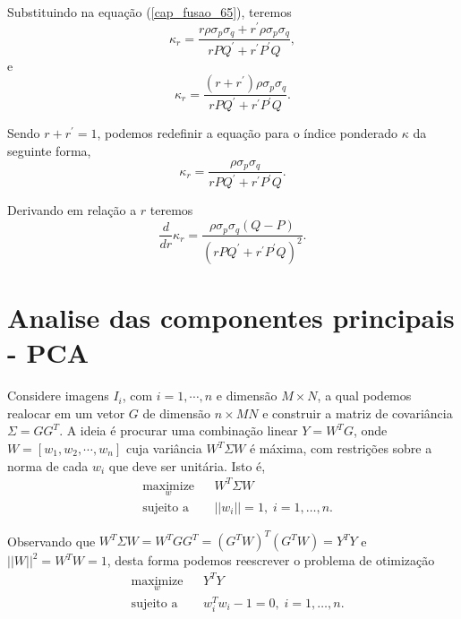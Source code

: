 Substituindo na equação (\ref{cap_fusao_65}), teremos
\begin{equation}\nonumber
	\kappa_r = \frac{r\rho \sigma_p\sigma_q + r^{'}\rho \sigma_p\sigma_q}{rPQ^{'} +r^{'}P^{'}Q},
\end{equation}
e
\begin{equation}\nonumber
	\kappa_r = \frac{(r+ r^{'})\rho \sigma_p\sigma_q}{rPQ^{'} +r^{'}P^{'}Q}.
\end{equation}

Sendo $r+r^{'}=1$, podemos redefinir a equação para o índice ponderado $\kappa$ da seguinte forma,
\begin{equation}\label{cap_fusao_26}
	\kappa_r = \frac{\rho \sigma_p\sigma_q}{rPQ^{'} +r^{'}P^{'}Q}.
\end{equation}

Derivando em relação a $r$ teremos
\begin{equation}\label{cap_fusao_26}
	\frac{d}{dr} \kappa_r= \frac{\rho \sigma_p\sigma_q(Q-P)}{(rPQ^{'} +r^{'}P^{'}Q)^2}.
\end{equation}
\section{Analise das componentes principais - PCA}
Considere imagens $I_i$, com $i=1,\cdots,n$ e dimensão $M\times N$, a qual podemos realocar em um vetor $G$ de dimensão $n \times MN$ e construir a matriz de covariância $\Sigma=GG^T$. A ideia é procurar uma combinação linear $Y=W^TG$, onde $W=\left[w_1,w_2,\cdots,w_n\right]$ cuja variância $W^T\Sigma W$ é máxima, com restrições sobre a norma de cada $w_i$ que deve ser unitária. Isto é,
\begin{equation*}
\begin{aligned}
& \underset{w}{\text{maximize}}
& & W^T\Sigma W \\
& \text{sujeito a}
& & ||w_i|| = 1, \; i = 1, \ldots, n.
\end{aligned}
\end{equation*}

Observando que $W^T\Sigma W=W^TGG^T=(G^TW)^T(G^TW)=Y^TY$ e $||W||^2=W^TW=1$, desta forma podemos reescrever o problema de otimização 
\begin{equation*}
\begin{aligned}
& \underset{w}{\text{maximize}}
& & Y^TY \\
& \text{sujeito a}
& & w_i^Tw_i - 1 = 0, \; i = 1, \ldots, n.
\end{aligned}
\end{equation*}


